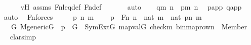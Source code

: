\begin{isabellebody}
\ \ \ \ \isamarkupfalse%
\ vH\ assms\ Fn{\isacharunderscore}{\kern0pt}leq{\isacharunderscore}{\kern0pt}def\ Fn{\isacharunderscore}{\kern0pt}def\ \isanewline
\ \ \ \ \isamarkupfalse%
\ auto\isanewline
\isanewline
\ \ \isamarkupfalse%
\ {\isachardoublequoteopen}q{\isacharbackquote}{\kern0pt}{\isacharless}{\kern0pt}m{\isacharcomma}{\kern0pt}\ n{\isachargreater}{\kern0pt}\ {\isacharequal}{\kern0pt}\ p{\isacharbackquote}{\kern0pt}{\isacharless}{\kern0pt}m{\isacharcomma}{\kern0pt}\ n{\isachargreater}{\kern0pt}{\isachardoublequoteclose}\ \isamarkupfalse%
\ papp\ qapp\ \isamarkupfalse%
\ auto\ \isanewline
{}\isamarkupfalse%
%
\endisatagproof
{\isafoldproof}%
%
\isadelimproof
\isanewline
%
\endisadelimproof
\isanewline
{}\isamarkupfalse%
\ Fn{\isacharunderscore}{\kern0pt}{}{\isacharunderscore}{\kern0pt}forces\ {\isacharcolon}{\kern0pt}\ \isanewline
\ \ \ p\ n\ m\ \isanewline
\ \ \ {\isachardoublequoteopen}p\ {\isasymin}\ Fn{\isachardoublequoteclose}\ {\isachardoublequoteopen}n\ {\isasymin}\ nat{\isachardoublequoteclose}\ {\isachardoublequoteopen}m\ {\isasymin}\ nat{\isachardoublequoteclose}\ {\isachardoublequoteopen}p{\isacharbackquote}{\kern0pt}{\isacharless}{\kern0pt}n{\isacharcomma}{\kern0pt}\ m{\isachargreater}{\kern0pt}\ {\isacharequal}{\kern0pt}\ {}{\isachardoublequoteclose}\ \isanewline
\ \ \ {\isachardoublequoteopen}{\isasymforall}G{\isachardot}{\kern0pt}\ M{\isacharunderscore}{\kern0pt}generic{\isacharparenleft}{\kern0pt}G{\isacharparenright}{\kern0pt}\ {\isasymand}\ p\ {\isasymin}\ G\ {\isasymlongrightarrow}\ SymExt{\isacharparenleft}{\kern0pt}G{\isacharparenright}{\kern0pt}{\isacharcomma}{\kern0pt}\ map{\isacharparenleft}{\kern0pt}val{\isacharparenleft}{\kern0pt}G{\isacharparenright}{\kern0pt}{\isacharcomma}{\kern0pt}\ {\isacharbrackleft}{\kern0pt}check{\isacharparenleft}{\kern0pt}m{\isacharparenright}{\kern0pt}{\isacharcomma}{\kern0pt}\ binmap{\isacharunderscore}{\kern0pt}row{\isacharprime}{\kern0pt}{\isacharparenleft}{\kern0pt}n{\isacharparenright}{\kern0pt}{\isacharbrackright}{\kern0pt}{\isacharparenright}{\kern0pt}\ {\isasymTurnstile}\ Member{\isacharparenleft}{\kern0pt}{}{\isacharcomma}{\kern0pt}\ {}{\isacharparenright}{\kern0pt}{\isachardoublequoteclose}\ \isanewline
%
\isadelimproof
\ \ %
\endisadelimproof
%
\isatagproof
{}\isamarkupfalse%
{\isacharparenleft}{\kern0pt}clarsimp{\isacharparenright}{\kern0pt}\isanewline

\end{isabellebody}
